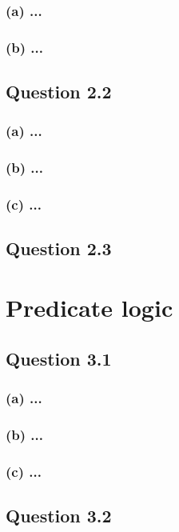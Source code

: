 \documentclass[10pt,a4paper]{article}
\begin{document}
\subsubsection*{(a) \mdseries ...}
\subsubsection*{(b) \mdseries ...}

\subsection*{Question 2.2}
\subsubsection*{(a) \mdseries ...}
\subsubsection*{(b) \mdseries ...}
\subsubsection*{(c) \mdseries ...}

\subsection*{Question 2.3}

\section{Predicate logic}
\subsection*{Question 3.1}
\subsubsection*{(a) \mdseries ...}
\subsubsection*{(b) \mdseries ...}
\subsubsection*{(c) \mdseries ...}

\subsection*{Question 3.2}
\end{document}
